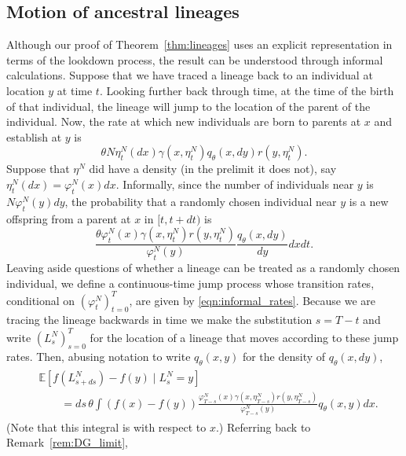 \documentclass[EJP]{ejpecp} %
\newcommand{\IE}{\mathbb E}
\begin{document}
\subsection{Motion of ancestral lineages}
\label{sec:lineage_motion}

Although our proof of Theorem~\ref{thm:lineages}
uses an explicit representation in terms of the lookdown process,
the result can be understood through informal calculations.
Suppose that we have traced a lineage back to an individual 
at location $y$ at time $t$.
Looking further back through time, at the time of the birth of that 
individual, the lineage will jump to the location of the parent of the
individual.
Now, the rate at which new individuals are born to parents at $x$ 
and establish at $y$ is
$$
\theta N\eta^N_t(dx)    \gamma(x, \eta^N_t) q_\theta(x, dy) r(y, \eta^N_t) .
$$
Suppose that $\eta^N$ did have a density (in the prelimit it does not),
say $\eta^N_t(dx) = \varphi^N_t(x) dx$.
Informally,
since the number of individuals near $y$ is $N\varphi^N_t(y) dy$,
the probability that a randomly chosen individual near $y$
is a new offspring from a parent at $x$ in $[t, t+dt)$ is
\begin{equation} \label{eqn:informal_rates}
\frac{\theta
    \varphi^N_t(x) \gamma(x, \eta^N_t) r(y, \eta^N_t)
}{
    \varphi^N_t(y)
} \frac{ q_\theta(x, dy) }{ dy } dx dt .
\end{equation}
Leaving aside questions of whether a lineage can be treated 
as a randomly chosen individual, we define
a continuous-time jump process 
whose transition rates, conditional on $(\varphi^N_t)_{t=0}^T$, 
are given by \eqref{eqn:informal_rates}. Because we are tracing the
lineage backwards 
in time we make the substitution $s=T-t$ and write
$(L^N_s)_{s=0}^T$ for the location of a lineage that moves 
according to these jump rates.
Then, abusing notation to write 
$q_\theta(x, y)$ for the density of $q_\theta(x,dy)$,
\begin{align} \label{eqn:lineage_generator_Edt}
    \begin{split}
    &\IE[f(L^N_{s+ds}) - f(y) \;|\; L^N_s = y]
    \\&\qquad 
    =
    ds\, \theta \int \left(f(x) - f(y)\right)
    \frac{
        \varphi^N_{T-s}(x) \gamma(x, \eta^N_{T-s}) r(y, \eta^N_{T-s})
    }{
        \varphi^N_{T-s}(y)
    }
    q_\theta(x, y) dx .
    \end{split}
\end{align}
(Note that this integral is with respect to $x$.)
Referring back to Remark~\ref{rem:DG_limit},
\end{document}
